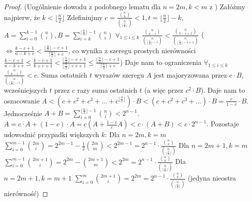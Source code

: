 \documentclass{pracamgr}
\begin{document}
   \begin{proof}
    (Uogólnienie dowodu z podobnego lematu dla $n=2m,k<m$ z \cite{LPV})\newline%
    Załóżmy najpierw, że $k<\lfloor\frac{n}{2}\rfloor$\newline
    Zdefiniujmy $c=\frac{{n\choose k}}{{n\choose \lfloor\frac{n}{2}\rfloor}}<1,t=\lfloor\frac{n}{2}\rfloor-k,$
    $A=\sum_{i=0}^{k-1}{n\choose i}, B=\sum_{i=k}^{\lfloor\frac{n}{2}\rfloor-1}{n\choose i}$\newline
    $\forall_{1\le i\le k}$ $\frac{{n\choose k-i}}{{n\choose \lfloor\frac{n}{2}\rfloor-i}}<\frac{{n\choose k-i+1}}{{n\choose \lfloor\frac{n}{2}\rfloor-i+1}}$
    ($\Leftrightarrow \frac{k-c+1}{n-k+c}<\frac{\lfloor\frac{n}{2}\rfloor-c+1}{\lceil\frac{n}{2}\rceil+c}$,\newline
    co wynika z szeregu prostych nierówności $\frac{k-c+1}{n-k+c}\le\frac{k-c+1}{k+c+1}
    <\frac{\lfloor\frac{n}{2}\rfloor-c+1}{\lfloor\frac{n}{2}\rfloor+c+1}\le\frac{\lfloor\frac{n}{2}\rfloor-c+1}{\lceil\frac{n}{2}\rceil+c}$)\newline
    Daje nam to ograniczenia $\forall_{1\le i\le k}$ $\frac{{n\choose k-i}}{{n\choose \lfloor\frac{n}{2}\rfloor-i}}<c$.\newline
    Suma ostatnich $t$ wyrazów szeregu $A$ jest majoryzowana przez $c\cdot B$, wcześniejszych $t$ przez $c$ razy suma ostatnich $t$ (a więc przez $c^2\cdot B$).
    Daje nam to oszacowanie $A<(c+c^2+c^3+...+c^{\lfloor\frac{k}{t}\rfloor})\cdot B<(c+c^2+c^3+...)\cdot B=\frac{c}{1-c}\cdot B$.
    Jednocześnie $A+B=\sum_{i=0}^{\lfloor\frac{n}{2}\rfloor-1}{n\choose i}<2^{n-1}$.
    $A=c\cdot A+(1-c)\cdot A=c(A+\frac{1-c}{c}A)<c\cdot(A+B)<c\cdot 2^{n-1}$.\newline
    Pozostaje udowodnić przypadki większych $k$:\newline
    Dla $n=2m,k=m$ $\sum_{i=0}^{m-1}{2m\choose i}=2^{2m-1}-\frac{1}{2}{2m\choose m}<2^{2m-1}=
    2^{n-1}\cdot\frac{{n\choose k}}{{n\choose \lfloor\frac{n}{2}\rfloor}}$\newline
    Dla $n=2m+1,k=m$ $\sum_{i=0}^{m-1}{2m+1\choose i}=2^{2m}-{2m+1\choose m}<2^{2m}=
    2^{n-1}\cdot\frac{{n\choose k}}{{n\choose \lfloor\frac{n}{2}\rfloor}}$\newline
    Dla $n=2m+1,k=m+1$ $\sum_{i=0}^{m}{2m+1\choose i}=2^{2m}=
    2^{n-1}\cdot\frac{{n\choose k}}{{n\choose \lfloor\frac{n}{2}\rfloor}}$ (jedyna nieostra nierówność)\newline
   \end{proof}
\end{document}
